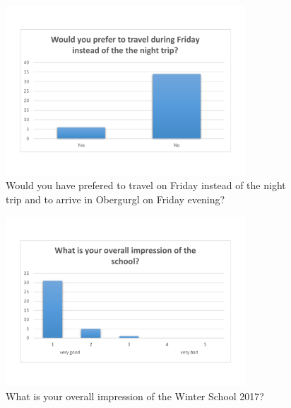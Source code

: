 \documentclass[11pt,a4paper]{article}
\numberwithin{equation}{section}
\numberwithin{table}{section}\setlength{\multlinegap}{25pt}
\begin{document}
\begin{figure}[H]
\centering
\includegraphics[width=0.8\textwidth]{eval/general/travel_per_night.pdf}
\caption{Would you have prefered to travel on Friday instead of the night trip and to arrive in Obergurgl on Friday evening?}
\end{figure}
\begin{figure}[H]
\centering
\includegraphics[width=0.8\textwidth]{eval/general/overall_impression.pdf}
\caption{What is your overall impression of the Winter School 2017?}
\end{figure}
\end{document}
